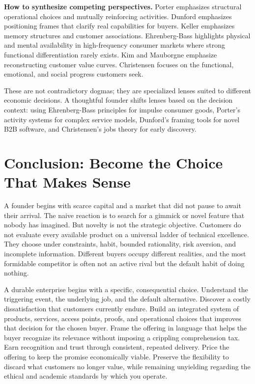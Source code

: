 \textbf{How to synthesize competing perspectives.} Porter emphasizes structural operational choices and mutually reinforcing activities. Dunford emphasizes positioning frames that clarify real capabilities for buyers. Keller emphasizes memory structures and customer associations. Ehrenberg-Bass highlights physical and mental availability in high-frequency consumer markets where strong functional differentiation rarely exists. Kim and Mauborgne emphasize reconstructing customer value curves. Christensen focuses on the functional, emotional, and social progress customers seek.

These are not contradictory dogmas; they are specialized lenses suited to different economic decisions. A thoughtful founder shifts lenses based on the decision context: using Ehrenberg-Bass principles for impulse consumer goods, Porter's activity systems for complex service models, Dunford's framing tools for novel B2B software, and Christensen's jobs theory for early discovery.

\section*{Conclusion: Become the Choice That Makes Sense}

A founder begins with scarce capital and a market that did not pause to await their arrival. The naive reaction is to search for a gimmick or novel feature that nobody has imagined. But novelty is not the strategic objective. Customers do not evaluate every available product on a universal ladder of technical excellence. They choose under constraints, habit, bounded rationality, risk aversion, and incomplete information. Different buyers occupy different realities, and the most formidable competitor is often not an active rival but the default habit of doing nothing.

A durable enterprise begins with a specific, consequential choice. Understand the triggering event, the underlying job, and the default alternative. Discover a costly dissatisfaction that customers currently endure. Build an integrated system of products, services, access points, proofs, and operational choices that improves that decision for the chosen buyer. Frame the offering in language that helps the buyer recognize its relevance without imposing a crippling comprehension tax. Earn recognition and trust through consistent, repeated delivery. Price the offering to keep the promise economically viable. Preserve the flexibility to discard what customers no longer value, while remaining unyielding regarding the ethical and academic standards by which you operate.

